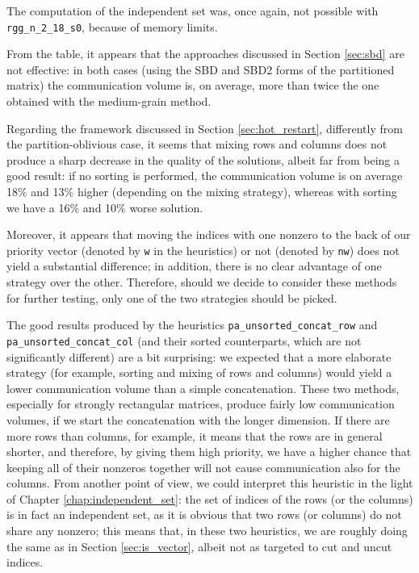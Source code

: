 The computation of the independent set was, once again, not possible with \verb|rgg_n_2_18_s0|, because of memory limits. 

From the table, it appears that the approaches discussed in Section \ref{sec:sbd} are not effective: in both cases (using the SBD and SBD2 forms of the partitioned matrix) the communication volume is, on average, more than twice the one obtained with the medium-grain method. 

Regarding the framework discussed in Section \ref{sec:hot_restart}, differently from the partition-oblivious case, it seems that mixing rows and columns does not produce a sharp decrease in the quality of the solutions, albeit far from being a good result: if no sorting is performed, the communication volume is on average 18\% and 13\% higher (depending on the mixing strategy), whereas with sorting we have a 16\% and 10\% worse solution.

Moreover, it appears that moving the indices with one nonzero to the back of our priority vector (denoted by \verb|w| in the heuristics) or not (denoted by \verb|nw|) does not yield a substantial difference; in addition, there is no clear advantage of one strategy over the other. Therefore, should we decide to consider these methods for further testing, only one of the two strategies should be picked.

The good results produced by the heuristics \verb|pa_unsorted_concat_row| and \verb|pa_unsorted_concat_col| (and their sorted counterparts, which are not significantly different) are a bit surprising: we expected that a more elaborate strategy (for example, sorting and mixing of rows and columns) would yield a lower communication volume than a simple concatenation. These two methods, especially for strongly rectangular matrices, produce fairly low communication volumes, if we start the concatenation with the longer dimension. If there are more rows than columns, for example, it means that the rows are in general shorter, and therefore, by giving them high priority, we have a higher chance that keeping all of their nonzeros together will not cause communication also for the columns. From another point of view, we could interpret this heuristic in the light of Chapter \ref{chap:independent_set}: the set of indices of the rows (or the columns) is in fact an independent set, as it is obvious that two rows (or columns) do not share any nonzero; this means that, in these two heuristics, we are roughly doing the same as in Section \ref{sec:is_vector}, albeit not as targeted to cut and uncut indices. 

